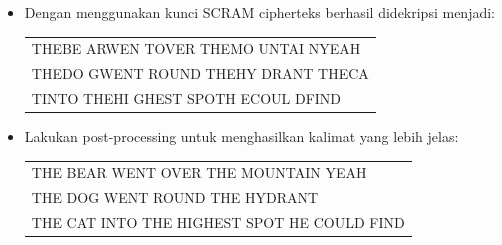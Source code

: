 \documentclass{article}
\begin{document}

\begin{itemize}
    \item Dengan menggunakan kunci SCRAM cipherteks berhasil didekripsi menjadi:
    
    \begin{center}
    \begin{tabular}{l}
    THEBE ARWEN TOVER THEMO UNTAI NYEAH \\
    THEDO GWENT ROUND THEHY DRANT THECA \\
    TINTO THEHI GHEST SPOTH ECOUL DFIND
    \end{tabular}
    \end{center}
    
    \item Lakukan post-processing untuk menghasilkan kalimat yang lebih jelas:
    
    \begin{center}
    \begin{tabular}{l}
    THE BEAR WENT OVER THE MOUNTAIN YEAH \\
    THE DOG WENT ROUND THE HYDRANT \\
    THE CAT INTO THE HIGHEST SPOT HE COULD FIND
    \end{tabular}
    \end{center}
\end{itemize}
\end{document}
